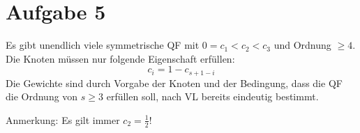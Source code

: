 \section*{Aufgabe 5}
Es gibt unendlich viele symmetrische QF mit $0=c_1 < c_2 < c_3$ und Ordnung $\geq 4$. Die Knoten müssen nur 
folgende Eigenschaft erfüllen:
\[c_i = 1 - c_{s+1-i}\]
Die Gewichte sind durch Vorgabe der Knoten und der Bedingung, dass 
die QF die Ordnung von $s \geq 3$ erfüllen soll, nach VL bereits 
eindeutig bestimmt.

Anmerkung: Es gilt immer $c_2 = \frac{1}{2}$!
